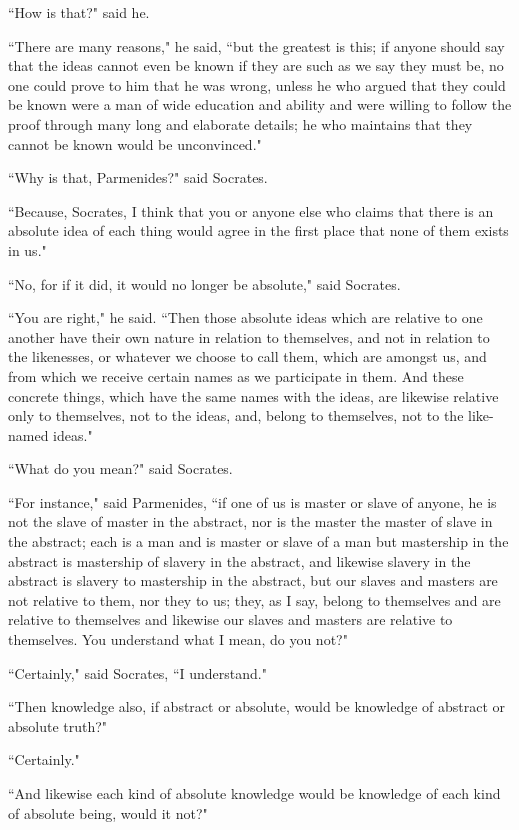 \documentclass[letterpaper,12pt]{article}
\newcommand{\stephpag}[1]{\marginnote{\small\itshape\fontfamily{ppl}\selectfont #1}}
\begin{document}
``How is that?" said he.

``There are many reasons," he said, ``but the greatest is this; if anyone should say that the ideas cannot even be known if they are such as we say they must be, no one could prove to him that he was wrong, unless he who argued that they could be known were a man of wide education and ability and were willing to follow the proof through many long and elaborate details; \stephpag{c} he who maintains that they cannot be known would be unconvinced."

``Why is that, Parmenides?" said Socrates.

``Because, Socrates, I think that you or anyone else who claims that there is an absolute idea of each thing would agree in the first place that none of them exists in us."

``No, for if it did, it would no longer be absolute," said Socrates.

``You are right," he said. ``Then those absolute ideas which are relative to one another have their own nature in relation to themselves, and not in relation to the likenesses, \stephpag{d} or whatever we choose to call them, which are amongst us, and from which we receive certain names as we participate in them. And these concrete things, which have the same names with the ideas, are likewise relative only to themselves, not to the ideas, and, belong to themselves, not to the like-named ideas."

``What do you mean?" said Socrates.

``For instance," said Parmenides, ``if one of us is master or slave of anyone, he is not the slave of master in the abstract, \stephpag{e} nor is the master the master of slave in the abstract; each is a man and is master or slave of a man but mastership in the abstract is mastership of slavery in the abstract, and likewise slavery in the abstract is slavery to mastership in the abstract, but our slaves and masters are not relative to them, nor they to us; \stephpag{134 a} they, as I say, belong to themselves and are relative to themselves and likewise our slaves and masters are relative to themselves. You understand what I mean, do you not?"

``Certainly," said Socrates, ``I understand."

``Then knowledge also, if abstract or absolute, would be knowledge of abstract or absolute truth?"

``Certainly."

``And likewise each kind of absolute knowledge would be knowledge of each kind of absolute being, would it not?"
\end{document}
